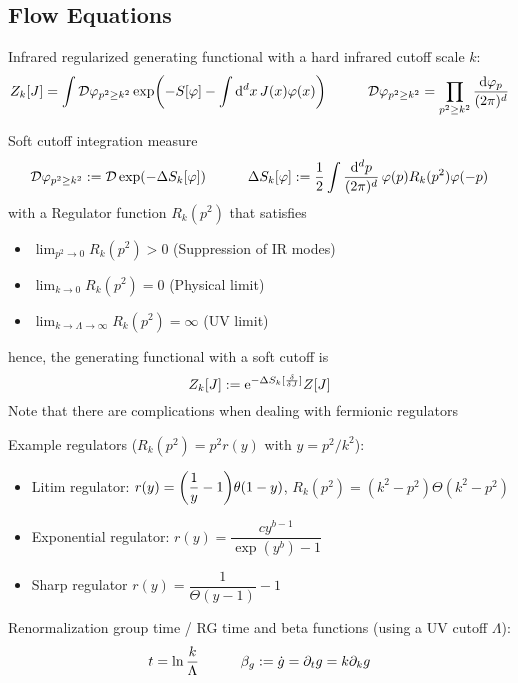 	\subsection{Flow Equations}
		Infrared regularized generating functional with a hard infrared cutoff scale $k$:
		\begin{equation}
			Z_k[J] = \int \mathcal{D}\varphi_{p^2 \ge k^2} \exp(-S[\varphi] - \int \dd^d x \, J(x) \varphi(x))
			\hspace{30pt} \mathcal{D}\varphi_{p^2 \ge k^2} = \prod_{p^2 \ge k^2} \frac{\dd \varphi_p}{(2\pi)^d}
		\end{equation}

		\noindent
		Soft cutoff integration measure
		\begin{equation}
			\mathcal{D}\varphi_{p^2 \ge k^2} := \mathcal{D} \exp(-\Delta S_k[\varphi])
			\hspace{30pt} \Delta S_k[\varphi] := \frac{1}{2} \int \frac{\dd^d p}{(2\pi)^d}\, \varphi(p)R_k(p^2) \varphi(-p)
		\end{equation}
		with a Regulator function $R_k(p^2)$ that satisfies
		\begin{itemize}\itemsep -0pt
			\item $\displaystyle\lim_{p^2 \to 0} R_k(p^2) > 0$ \hfill{(Suppression of IR modes)}
			\item $\displaystyle\lim_{k \to 0} R_k(p^2) = 0$ \hfill{(Physical limit)}
			\item $\displaystyle\lim_{k \to \Lambda \to \infty} R_k(p^2) = \infty$ \hfill{(UV limit)}
		\end{itemize}
		hence, the generating functional with a soft cutoff is
		\begin{equation}
			Z_k[J] := \ex^{-\Delta S_k [\fdv{J}]}Z[J]
		\end{equation}
		Note that there are complications when dealing with fermionic regulators

		\noindent
		Example regulators ($R_k(p^2) = p^2 r(y)$ with $y=p^2/k^2$):
		\begin{itemize} \itemsep -0pt
			\item Litim regulator: $r(y) = \qty(\dfrac{1}{y}-1)\theta(1-y)$, \ie $R_k(p^2) = (k^2 - p^2) \Theta(k^2 - p^2)$
			\item Exponential regulator: $r(y) = \dfrac{cy^{b-1}}{\exp(y^b) - 1}$
			\item Sharp regulator $r(y) = \dfrac{1}{\Theta(y-1)}-1$
		\end{itemize}

		\noindent
		Renormalization group time / RG time and beta functions (using a UV cutoff $\Lambda$):
		\begin{equation}
			t = \ln \frac{k}{\Lambda}
			\hspace{30pt} \beta_g := \dot{g} = \partial_t g = k \partial_k g
		\end{equation}


